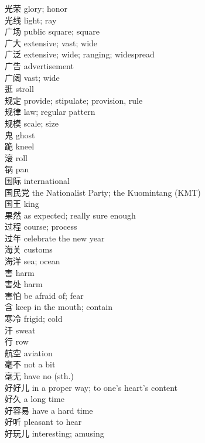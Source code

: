 光荣 \quad glory; honor\\
光线 \quad light; ray\\
广场 \quad public square; square\\
广大 \quad extensive; vast; wide\\
广泛 \quad extensive; wide; ranging; widespread\\
广告 \quad advertisement\\
广阔 \quad vast; wide\\
逛 \quad stroll\\
规定 \quad provide; stipulate; provision, rule\\
规律 \quad law; regular pattern\\
规模 \quad scale; size\\
鬼 \quad ghost\\
跪 \quad kneel\\
滚 \quad roll\\
锅 \quad pan\\
国际 \quad international\\
国民党 \quad the Nationalist Party; the Kuomintang (KMT)\\
国王 \quad king\\
果然 \quad as expected; really sure enough\\
过程 \quad course; process\\
过年 \quad celebrate the new year\\
海关 \quad customs\\
海洋 \quad sea; ocean\\
害 \quad harm\\
害处 \quad harm\\
害怕 \quad be afraid of; fear\\
含 \quad keep in the mouth; contain\\
寒冷 \quad frigid; cold\\
汗 \quad sweat\\
行 \quad row\\
航空 \quad aviation\\
毫不 \quad not a bit\\
毫无 \quad have no (sth.)\\
好好儿 \quad in a proper way; to one's heart's content\\
好久 \quad a long time\\
好容易 \quad have a hard time\\
好听 \quad pleasant to hear\\
好玩儿 \quad interesting; amusing\\
